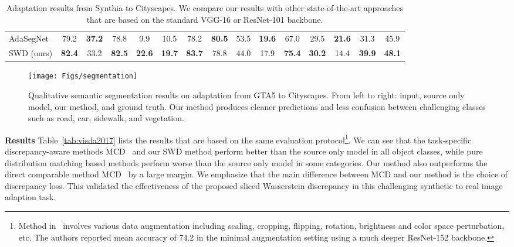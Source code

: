 \documentclass[10pt,twocolumn,letterpaper]{article}
\begin{document}
\begin{table*}[tbp]
\begin{center}
{\begin{tabular}{l|ccccccccccccc|c }
AdaSegNet~\cite{tsai2018learning} & 79.2 & \bf 37.2 & 78.8 & 9.9 & 10.5 & 78.2 & \bf 80.5 & 53.5 & \bf 19.6 & 67.0 & 29.5 & \bf 21.6 & 31.3 & 45.9  \\
SWD (ours) & \bf 82.4 & 33.2 & \bf 82.5 & \bf 22.6 & \bf 19.7 & \bf 83.7 & 78.8 & 44.0 & 17.9 & \bf 75.4 & \bf 30.2 & 14.4 & \bf 39.9 & \bf 48.1\\
\bottomrule
  \end{tabular}
  }
  \end{center}
   \vspace{-6mm}
     \caption{Adaptation results from Synthia to Cityscapes. We compare our results with other state-of-the-art approaches that are based on the standard VGG-16 or ResNet-101 backbone.}
      \label{tb:synthia2city}
      \vspace{-3mm}
\end{table*} \begin{figure*}[h]
\begin{center}
\texttt{[image: Figs/segmentation]}
\end{center}
\vspace{-6mm}
   \caption{Qualitative semantic segmentation results on adaptation from GTA5 to Cityscapes. From left to right: input, source only model, our method, and ground truth. Our method produces cleaner predictions and less confusion between challenging classes such as road, car, sidewalk, and vegetation.}
\label{fig:segmentation}
\vspace{-3mm}
\end{figure*}

\vspace{2mm}
\noindent \textbf{Results}
Table~\ref{tab:visda2017} lists the results that are based on the same evaluation protocol\footnote{Method in~\cite{french2017self} involves various data augmentation including scaling, cropping, flipping, rotation, brightness and color space perturbation, etc. The authors reported mean accuracy of 74.2 in the minimal augmentation setting using a much deeper ResNet-152 backbone.}. We can see that the task-specific discrepancy-aware methods MCD~\cite{saito2017maximum} and our SWD method perform better than the source only model in all object classes, while pure distribution matching based methods perform worse than the source only model in some categories.
Our method also outperforms the direct comparable method MCD~\cite{saito2017maximum} by a large margin. We emphasize that the main difference between MCD and our method is the choice of discrepancy loss. This validated the effectiveness of the proposed sliced Wasserstein discrepancy in this challenging synthetic to real image adaption task.
\end{document}
